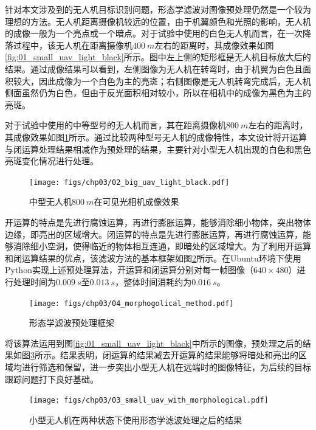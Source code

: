 针对本文涉及到的无人机目标识别问题，形态学滤波对图像预处理仍然是一个较为理想的方法。无人机距离摄像机较远的位置，由于机翼颜色和光照的影响，无人机的成像一般为一个亮点或一个暗点。对于试验中使用的白色无人机而言，在一次降落过程中，该无人机在距离摄像机$400\ m$左右的距离时，其成像效果如图\ref{fig:01_small_uav_light_black}所示。图中左上侧的矩形框是无人机目标放大后的结果。通过成像结果可以看到，左侧图像为无人机在转弯时，由于机翼为白色且面积较大，因此成像为一个白色为主的亮斑；右侧图像是无人机转弯完成后，无人机侧面虽然仍为白色，但由于反光面积相对较小，所以在相机中的成像为黑色为主的亮斑。


对于试验中使用的中等型号的无人机而言，其在距离摄像机$800\ m$左右的距离时，其成像效果如图\ref{fig:02_big_uav_light_black}所示。通过比较两种型号无人机的成像特性，本文设计将开运算与闭运算处理结果相减作为预处理的结果，主要针对小型无人机出现的白色和黑色亮斑变化情况进行处理。

\begin{figure}[htb]   
	\centering
	\texttt{[image: figs/chp03/02\_big\_uav\_light\_black.pdf]}
	\caption{中型无人机$800\ m$在可见光相机成像效果}
	\label{fig:02_big_uav_light_black}
\end{figure}

开运算的特点是先进行腐蚀运算，再进行膨胀运算，能够消除细小物体，突出物体边缘，即亮出的区域增大。闭运算的特点是先进行膨胀运算，再进行腐蚀运算，能够消除细小空洞，使得临近的物体相互连通，即暗处的区域增大。为了利用开运算和闭运算结果的优点，该滤波方法的基本框架如图\ref{fig:04_morphogolical_method}所示。在Ubuntu环境下使用Python实现上述预处理算法，开运算和闭运算分别对每一帧图像（$640 \times 480$）进行处理时间为$0.009\ s$至$0.013\ s$，整体时间消耗约为$0.016\ s$。

\begin{figure}[htb]   
	\centering
	\texttt{[image: figs/chp03/04\_morphogolical\_method.pdf]}
	\caption{形态学滤波预处理框架}
	\label{fig:04_morphogolical_method}
\end{figure}

将该算法运用到图\ref{fig:01_small_uav_light_black}中所示的图像，预处理之后的结果如图\ref{fig:03_small_uav_with_morphological}所示。结果表明，闭运算的结果减去开运算的结果能够将暗处和亮出的区域均进行筛选和保留，进一步突出小型无人机在远端时的图像特征，为后续的目标跟踪问题打下良好基础。

\begin{figure}[htb]   
	\centering
	\texttt{[image: figs/chp03/03\_small\_uav\_with\_morphological.pdf]}
	\caption{小型无人机在两种状态下使用形态学滤波处理之后的结果}
	\label{fig:03_small_uav_with_morphological}
\end{figure}


